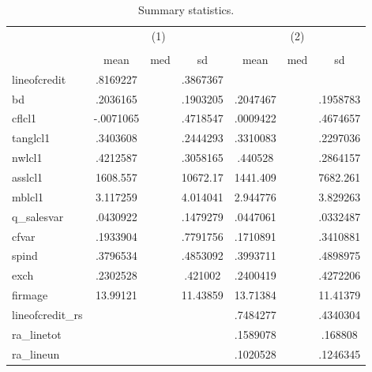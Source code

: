 \begin{table}[htbp]\centering
\def\sym#1{\ifmmode^{#1}\else\(^{#1}\)\fi}
\caption{Summary statistics.}
\begin{tabular}{l*{2}{ccc}}
\hline\hline
            &\multicolumn{3}{c}{(1)}               &\multicolumn{3}{c}{(2)}               \\
            &\multicolumn{3}{c}{}                  &\multicolumn{3}{c}{}                  \\
            &        mean&         med&          sd&        mean&         med&          sd\\
\hline
lineofcredit&    .8169227&            &    .3867367&            &            &            \\
bd          &    .2036165&            &    .1903205&    .2047467&            &    .1958783\\
cflcl1      &   -.0071065&            &    .4718547&    .0009422&            &    .4674657\\
tanglcl1    &    .3403608&            &    .2444293&    .3310083&            &    .2297036\\
nwlcl1      &    .4212587&            &    .3058165&     .440528&            &    .2864157\\
asslcl1     &    1608.557&            &    10672.17&    1441.409&            &    7682.261\\
mblcl1      &    3.117259&            &    4.014041&    2.944776&            &    3.829263\\
q\_salesvar  &    .0430922&            &    .1479279&    .0447061&            &    .0332487\\
cfvar       &    .1933904&            &    .7791756&    .1710891&            &    .3410881\\
spind       &    .3796534&            &    .4853092&    .3993711&            &    .4898975\\
exch        &    .2302528&            &     .421002&    .2400419&            &    .4272206\\
firmage     &    13.99121&            &    11.43859&    13.71384&            &    11.41379\\
lineofcredit\_rs&            &            &            &    .7484277&            &    .4340304\\
ra\_linetot  &            &            &            &    .1589078&            &     .168808\\
ra\_lineun   &            &            &            &    .1020528&            &    .1246345\\

\end{tabular}
\end{table}
